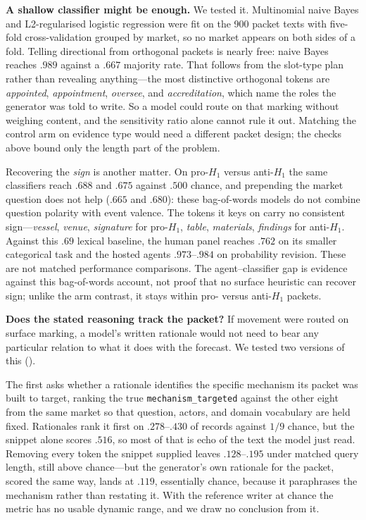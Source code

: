 \textbf{A shallow classifier might be enough.} We tested it. Multinomial naive
Bayes and L2-regularised logistic regression were fit on the 900 packet texts with
five-fold cross-validation grouped by market, so no market appears on both sides
of a fold. Telling directional from orthogonal packets is nearly free: naive Bayes
reaches $.989$ against a $.667$ majority rate. That follows from the slot-type
plan rather than revealing anything---the most distinctive orthogonal tokens are
\emph{appointed}, \emph{appointment}, \emph{oversee}, and \emph{accreditation},
which name the roles the generator was told to write. So a model could route on
that marking without weighing content, and the sensitivity ratio alone cannot rule
it out. Matching the control arm on evidence type would need a different packet
design; the checks above bound only the length part of the problem.

Recovering the \emph{sign} is another matter. On pro-$H_1$ versus anti-$H_1$ the
same classifiers reach $.688$ and $.675$ against $.500$ chance, and prepending the
market question does not help ($.665$ and $.680$): these bag-of-words models do
not combine question polarity with event valence. The tokens it keys on carry no
consistent sign---\emph{vessel}, \emph{venue}, \emph{signature} for pro-$H_1$,
\emph{table}, \emph{materials}, \emph{findings} for anti-$H_1$. Against this $.69$ lexical baseline, the human panel reaches $.762$ on its
smaller categorical task and the hosted agents $.973$--$.984$ on probability
revision. These are not matched performance comparisons. The agent--classifier gap
is evidence against this bag-of-words account, not proof that no surface heuristic
can recover sign; unlike the arm contrast, it stays within pro- versus anti-$H_1$
packets.

\textbf{Does the stated reasoning track the packet?} If movement were routed on
surface marking, a model's written rationale would not need to bear any particular
relation to what it does with the forecast. We tested two versions of this
().

The first asks whether a rationale identifies the specific mechanism its packet was
built to target, ranking the true \texttt{mechanism\_targeted} against the other
eight from the same market so that question, actors, and domain vocabulary are held
fixed. Rationales rank it first on $.278$--$.430$ of records against $1/9$ chance,
but the snippet alone scores $.516$, so most of that is echo of the text the model
just read. Removing every token the snippet supplied leaves $.128$--$.195$ under
matched query length, still above chance---but the generator's own rationale for
the packet, scored the same way, lands at $.119$, essentially chance, because it
paraphrases the mechanism rather than restating it. With the reference writer at
chance the metric has no usable dynamic range, and we draw no conclusion from it.

